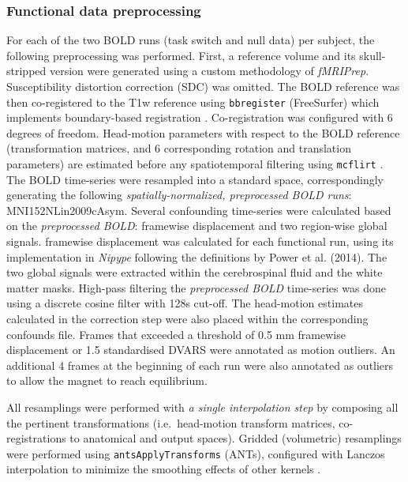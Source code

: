 \documentclass[phd,appendix,figures]{uithesis}
\begin{document}
\subsubsection*{Functional data preprocessing}
\label{methods:func}

For each of the two BOLD runs (task switch and null data) per subject,
the following preprocessing was performed.
First, a reference volume and its skull-stripped version were generated
using a custom methodology of \emph{fMRIPrep}.
Susceptibility distortion correction (SDC) was omitted.
The BOLD reference was then co-registered to the T1w reference using \texttt{bbregister}
(FreeSurfer) which implements boundary-based registration \cite{bbr}.
Co-registration was configured with 6 degrees of freedom.
Head-motion parameters with respect to the BOLD reference (transformation matrices,
and 6 corresponding rotation and translation parameters) are estimated before any
spatiotemporal filtering using \texttt{mcflirt} \cite[FSL 5.0.9,]{mcflirt}.
The BOLD time-series were resampled into a standard space, correspondingly
generating the following \emph{spatially-normalized, preprocessed BOLD runs}:
MNI152NLin2009cAsym.
Several confounding time-series were calculated based on the \emph{preprocessed BOLD}:
framewise displacement and two region-wise global signals.
framewise displacement was calculated for each functional run, using its
implementation in \emph{Nipype} following the definitions
by Power et al. (2014)\cite{power_fd_dvars}.
The two global signals were extracted within the
cerebrospinal fluid and the white matter masks.
High-pass filtering the \emph{preprocessed BOLD} time-series was done using
a discrete cosine filter with 128s cut-off.
The head-motion estimates calculated in
the correction step were also placed within the corresponding confounds file. 
Frames that exceeded a threshold of 0.5 mm framewise displacement or 1.5 standardised DVARS
were annotated as motion outliers.
An additional 4 frames at the beginning of each run were also
annotated as outliers to allow the magnet to reach equilibrium.

All resamplings were performed with \emph{a single interpolation step} by composing all the pertinent
transformations (i.e.~head-motion transform matrices, co-registrations to anatomical
and output spaces).
Gridded (volumetric) resamplings were performed using \texttt{antsApplyTransforms} (ANTs),
configured with Lanczos interpolation to minimize the smoothing effects of other kernels
\cite{lanczos}.
\end{document}
